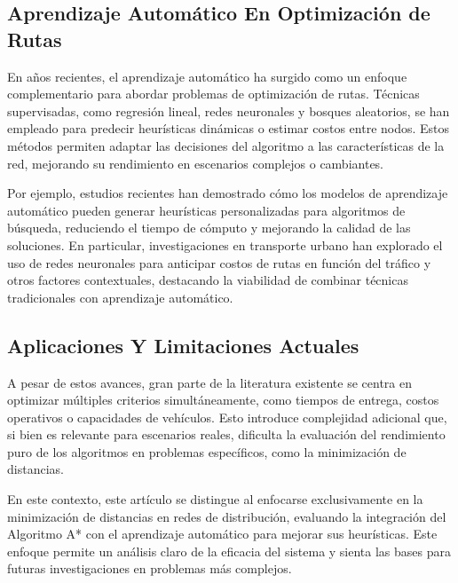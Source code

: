 \documentclass[conference]{IEEEtran}
\begin{document}
	\subsection{Aprendizaje Automático En Optimización de Rutas}
	En años recientes, el aprendizaje automático ha surgido como un enfoque complementario para abordar problemas de optimización de rutas. Técnicas supervisadas, como regresión lineal, redes neuronales y bosques aleatorios, se han empleado para predecir heurísticas dinámicas o estimar costos entre nodos. Estos métodos permiten adaptar las decisiones del algoritmo a las características de la red, mejorando su rendimiento en escenarios complejos o cambiantes.
	
	Por ejemplo, estudios recientes han demostrado cómo los modelos de aprendizaje automático pueden generar heurísticas personalizadas para algoritmos de búsqueda, reduciendo el tiempo de cómputo y mejorando la calidad de las soluciones. En particular, investigaciones en transporte urbano han explorado el uso de redes neuronales para anticipar costos de rutas en función del tráfico y otros factores contextuales, destacando la viabilidad de combinar técnicas tradicionales con aprendizaje automático.
	
	\subsection{Aplicaciones Y Limitaciones Actuales}
	A pesar de estos avances, gran parte de la literatura existente se centra en optimizar múltiples criterios simultáneamente, como tiempos de entrega, costos operativos o capacidades de vehículos. Esto introduce complejidad adicional que, si bien es relevante para escenarios reales, dificulta la evaluación del rendimiento puro de los algoritmos en problemas específicos, como la minimización de distancias.
	
	En este contexto, este artículo se distingue al enfocarse exclusivamente en la minimización de distancias en redes de distribución, evaluando la integración del Algoritmo A* con el aprendizaje automático para mejorar sus heurísticas. Este enfoque permite un análisis claro de la eficacia del sistema y sienta las bases para futuras investigaciones en problemas más complejos.
	
\end{document}
